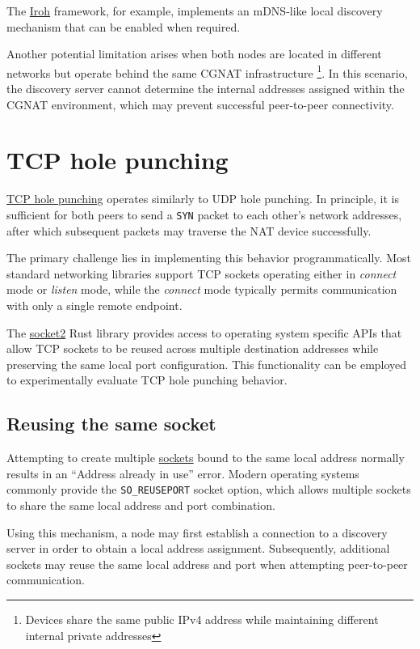 \documentclass[a4paper, 10pt]{article}
\let\oldsection\section
\renewcommand{\section}{
  \clearpage
  \oldsection
}
\begin{document}
The \href{https://docs.iroh.computer/connecting/local-discovery}{Iroh} framework, for example, implements an mDNS-like local discovery mechanism that can be enabled when required.

Another potential limitation arises when both nodes are located in different networks but operate behind the same CGNAT infrastructure
\footnote{Devices share the same public IPv4 address while maintaining different internal private addresses}.
In this scenario, the discovery server cannot determine the internal addresses assigned within the CGNAT environment, which may prevent successful peer-to-peer connectivity.

\section{TCP hole punching}

\href{https://en.wikipedia.org/wiki/TCP_hole_punching}{TCP hole punching} operates similarly to UDP hole punching.
In principle, it is sufficient for both peers to send a \texttt{SYN} packet to each other's network addresses,
after which subsequent packets may traverse the NAT device successfully.

The primary challenge lies in implementing this behavior programmatically.
Most standard networking libraries support TCP sockets operating either in \emph{connect} mode or \emph{listen} mode,
while the \emph{connect} mode typically permits communication with only a single remote endpoint.

The \href{https://crates.io/crates/socket2}{socket2} Rust library provides access to operating system specific APIs
that allow TCP sockets to be reused across multiple destination addresses while preserving the same local port configuration.
This functionality can be employed to experimentally evaluate TCP hole punching behavior.

\subsection{Reusing the same socket}

Attempting to create multiple \href{https://en.wikipedia.org/wiki/Network_socket}{sockets} bound to the same local address
normally results in an ``Address already in use'' error. Modern operating systems commonly provide the \texttt{SO\_REUSEPORT} socket option,
which allows multiple sockets to share the same local address and port combination.

Using this mechanism, a node may first establish a connection to a discovery server in order to obtain a local address assignment.
Subsequently, additional sockets may reuse the same local address and port when attempting peer-to-peer communication.
\end{document}
